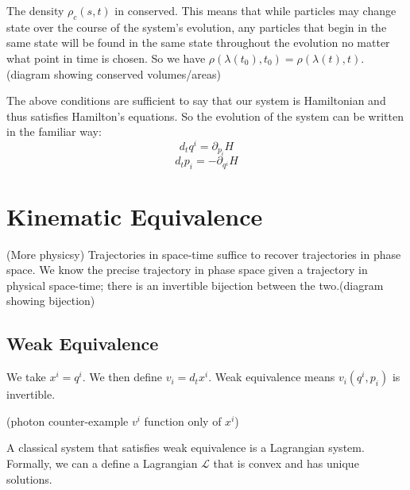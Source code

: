 \documentclass{article}
\begin{document}
\begin{prop}
	The density $\rho_c(s,t)$ in conserved. This means that while particles may change state over the course of the system's evolution, any particles that begin in the same state will be found in the same state throughout the evolution no matter what point in time is chosen. So we have $\rho(\lambda(t_0),t_0) = \rho(\lambda(t),t)$. (diagram showing conserved volumes/areas)
\end{prop}

\begin{prop}
	The above conditions are sufficient to say that our system is Hamiltonian and thus satisfies Hamilton's equations. So the evolution of the system can be written in the familiar way:
	$$d_tq^i = \partial_{p_i}H$$
	$$d_tp_i = -\partial_{q^i}H$$
\end{prop} 
	

\section{Kinematic Equivalence}

\begin{assump}
	(More physicsy) Trajectories in space-time suffice to recover trajectories in phase space. We know the precise trajectory in phase space given a trajectory in physical space-time; there is an invertible bijection between the two.(diagram showing bijection)
\end{assump}

\subsection{Weak Equivalence}

\begin{defn}
	We take $x^i = q^i$. We then define $v_i = d_tx^i$. Weak equivalence means $v_i(q^i, p_i)$ is invertible.
\end{defn}

(photon counter-example $v^i$ function only of $x^i$)

\begin{prop}
	A classical system that satisfies weak equivalence is a Lagrangian system. Formally, we can a define a Lagrangian $\mathcal{L}$ that is convex and has unique solutions.
\end{prop}
\end{document}
